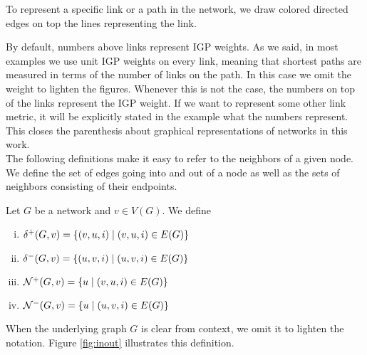 To represent a specific link or a path in the network, we draw colored directed edges on top the 
lines representing the link. 

By default, numbers above links represent IGP weights. 
As we said, in most examples we use unit IGP weights on every link, meaning that shortest paths are measured
in terms of the number of links on the path. In this case we omit the weight to lighten the figures. 
Whenever this is not the case, the numbers on top of the
links represent the IGP weight. If we want to represent some other link metric, it will be explicitly stated
in the example what the numbers represent. This closes the parenthesis about graphical representations
of networks in this work. \\

The following definitions make it easy to refer to the neighbors of a given node. We define the set of 
edges going into and out of a node as well as the sets of neighbors consisting of their endpoints.

\begin{definition}
Let $G$ be a network and $v \in V(G)$. We define
\begin{enumerate}[i)]
 \item $\delta^+(G, v) = \{ (v, u, i) \mid (v, u, i) \in E(G) \}$
 \item $\delta^-(G, v) = \{ (u, v, i) \mid (u, v, i) \in E(G) \}$
 \item $\mathcal{N}^+(G, v) = \{ u \mid (v, u, i)  \in E(G) \}$
 \item $\mathcal{N}^-(G, v) = \{ u \mid (u, v, i) \in E(G) \}$
\end{enumerate}
\end{definition}

When the underlying graph $G$ is clear from context, we omit it to lighten the notation.
Figure \ref{fig:inout} illustrates this definition.


